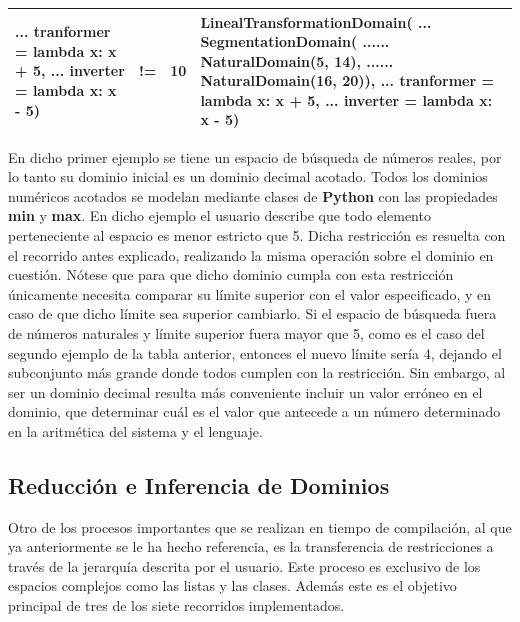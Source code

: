 \begin{longtable}{ | p{6cm} | p{2cm}| p{3.5cm}| p{6.5cm}|  }
    ... tranformer = lambda x: x + 5, \newline
    ... inverter = lambda x: x - 5)   &
    !=                                &
    10                                &
    LinealTransformationDomain(\newline
    ... SegmentationDomain(\newline
    ...... NaturalDomain(5, 14), \newline
    ...... NaturalDomain(16, 20)), \newline
    ... tranformer = lambda x: x + 5,\newline
    ... inverter = lambda x: x - 5)                                                                     \\
    \hline
\end{longtable}

En dicho primer ejemplo se tiene un espacio de búsqueda de números reales, por lo tanto su dominio inicial es un dominio decimal acotado.
Todos los dominios numéricos acotados se modelan mediante clases de {\bf Python} con las propiedades {\bf min} y {\bf max}. 
En dicho ejemplo el usuario describe que todo elemento perteneciente
al espacio es menor estricto que 5. Dicha restricción es resuelta con el recorrido antes explicado, realizando la misma operación sobre
el dominio en cuestión. Nótese que para que dicho dominio cumpla con esta restricción únicamente necesita comparar su límite superior
con el valor especificado, y en caso de que dicho límite sea superior cambiarlo. Si el espacio de búsqueda fuera de números naturales y
límite superior fuera mayor que 5, como es el caso del segundo ejemplo de la tabla anterior, entonces el nuevo límite sería 4, dejando
el subconjunto más grande donde todos cumplen con la restricción. Sin embargo, al ser un dominio decimal resulta más conveniente
incluir un valor erróneo en el dominio, que determinar cuál es el valor que antecede a un número determinado en la aritmética del
sistema y el lenguaje.

\subsection{Reducción e Inferencia de Dominios}

Otro de los procesos importantes que se realizan en tiempo de compilación, al que ya anteriormente se le ha hecho referencia,
es la transferencia de restricciones a través de la jerarquía descrita por el usuario. Este proceso es exclusivo de los espacios
complejos como las listas y las clases. Además este es el objetivo principal de tres de los siete recorridos implementados.


